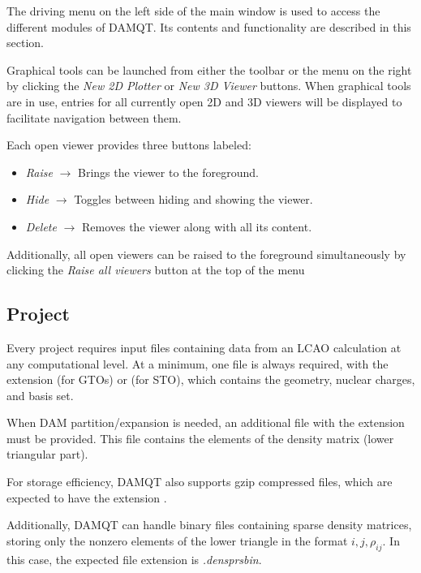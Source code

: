\documentclass[10pt]{article}
\begin{document}
The driving menu on the left side of the main window is used to access the different modules of DAMQT.
Its contents and functionality are described in this section.

Graphical tools can be launched from either the toolbar or the menu on the right
by clicking the {\it New 2D Plotter} or {\it New 3D Viewer} buttons.
When graphical tools are in use, entries for all currently open 2D and 3D viewers
will be displayed to facilitate navigation between them.

Each open viewer provides three buttons labeled:
\begin{itemize}
\item {\it Raise} $\rightarrow$ Brings the viewer to the foreground.
\item {\it Hide} $\rightarrow$ Toggles between hiding and showing the viewer.
\item {\it Delete} $\rightarrow$ Removes the viewer along with all its content.
\end{itemize}

Additionally, all open viewers can be raised to the foreground simultaneously
by clicking the {\it Raise all viewers} button at the top of the menu


\subsection{Project \label{sec:2.1}}


Every project requires input files containing data from an LCAO calculation at any computational level.
At a minimum, one file is always required, with the extension \ggbs{} (for GTOs) or
\sgbs{} (for STO), which contains the geometry, nuclear charges, and basis set.

When DAM partition/expansion is needed, an additional file with the extension \den{}
must be provided. This file contains the elements of the density matrix (lower triangular part).

For storage efficiency, DAMQT also supports gzip compressed \den{} files,
which are expected to have the extension \dengz{}.

Additionally, DAMQT can handle binary files containing sparse density matrices,
storing only the nonzero elements of the lower triangle in the format $i,j,\rho_{ij}$.
In this case, the expected file extension is {\it .densprsbin}.
\end{document}
